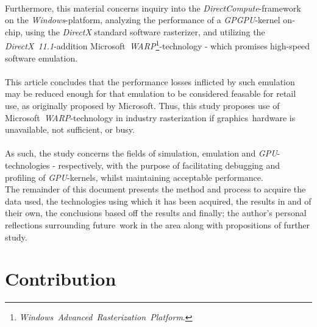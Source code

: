 \documentclass[fleqn,10pt]{SelfArx} %
\begin{document}
\\
Furthermore, this material concerns inquiry into the \textit{DirectCompute}-framework on the \textit{Windows}-platform, analyzing the performance of a \textit{GPGPU}-kernel on-chip, using the \textit{DirectX} standard software rasterizer, and utilizing the \textit{DirectX~11.1}-addition Microsoft~\textit{WARP}\footnote{\textit{Windows~Advanced~Rasterization~Platform}.}-technology - which promises high-speed software emulation. \\
\\
This article concludes that the performance losses inflicted by such emulation may be reduced enough for that emulation to be considered feasable for retail use, as originally proposed by Microsoft. Thus, this study proposes use of Microsoft~\textit{WARP}-technology in industry rasterization if graphics~hardware is unavailable, not sufficient, or busy.\\
\\
As such, the study concerns the fields of simulation, emulation and \textit{GPU}-technologies - respectively, with the purpose of facilitating debugging and profiling of \textit{GPU}-kernels, whilst maintaining acceptable performance. \\
The remainder of this document presents the method and process to acquire the data used,  the technologies using which it has been acquired, the results in and of their own, the conclusions based off the results and finally; the author's personal reflections surrounding future~work in the area along with propositions of further study.

\section{Contribution}
\label{sec:contribution}

\end{document}

